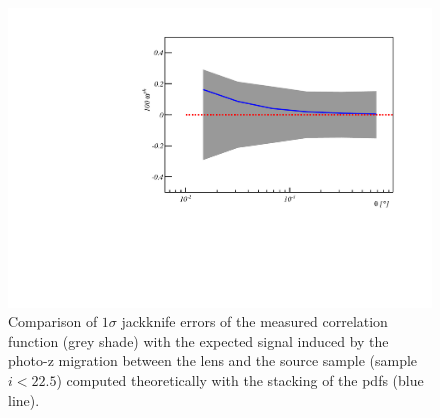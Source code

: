 \begin{figure}
\includegraphics[width=\textwidth]{./figures/mag_itheo_photoz_short.pdf}
\caption{Comparison of $1\sigma$ jackknife errors of the measured correlation function (grey shade) with the expected signal induced by the photo-z migration between the lens and the source sample (sample $i<22.5$) computed theoretically with the stacking of the pdfs (blue line).}
\label{fig:theophotoz}
\end{figure}

